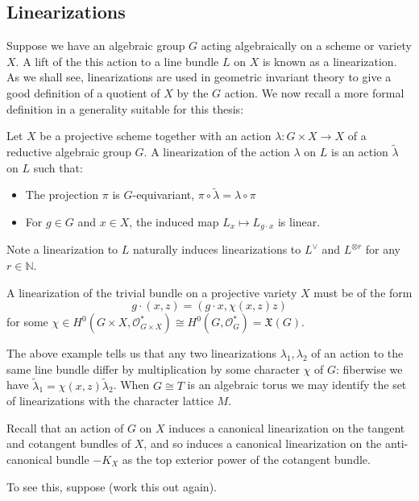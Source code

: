 \subsection{Linearizations} \label{basics:linearizations}
Suppose we have an algebraic group \(G\) acting algebraically on a scheme or variety \(X\). A lift of the this action to a line bundle \(L\) on \(X\) is known as a linearization. As we shall see, linearizations are used in geometric invariant theory to give a good definition of a quotient of \(X\) by the \(G\) action. We now recall a more formal definition in a generality suitable for this thesis:
\begin{definition}
 Let \(X\) be a projective scheme together with an action \( \lambda : G \times X \to X\) of a reductive algebraic group \(G\). A linearization of the action \(\lambda\) on \(L\) is an action \(\tilde{\lambda}\) on \(L\) such that:
\begin{itemize}
\item The projection \(\pi\) is \(G\)-equivariant, \(\pi \circ \tilde{\lambda} = \lambda \circ \pi \)
\item For \(g \in G\) and \(x \in X\), the induced map \(L_x \mapsto L_{g \cdot x}\) is linear.
\end{itemize}
\end{definition}
%
%
%
Note a linearization to \(L\) naturally induces linearizations to \(L^\vee\) and \(L^{\otimes r}\) for any \(r \in \mathbb{N}\).
%
%
%
\begin{example}
A linearization of the trivial bundle on a projective variety \(X\) must be of the form
\[
g \cdot (x,z) = (g \cdot x, \chi(x,z)z)
\]
for some \(\chi \in H^0(G \times X, \mathcal{O}_{G \times X}^*) \cong H^0(G, \mathcal{O}_G^*) = \mathfrak{X}(G).\)
\end{example}
The above example tells us that any two linearizations \(\lambda_1,\lambda_2\) of an action to the same line bundle differ by multiplication by some character \(\chi\) of \(G\): fiberwise we have \(\tilde{\lambda}_1 = \chi(x,z) \tilde{\lambda}_2\). When \(G \cong T\) is an algebraic torus we may identify the set of linearizations with the character lattice \(M\).
\begin{example}
Recall that an action of \(G\) on \(X\) induces a canonical linearization on the tangent and cotangent bundles of \(X\), and so induces a canonical linearization on the anti-canonical bundle \(-K_X\) as the top exterior power of the cotangent bundle.

To see this, suppose (work this out again).
\end{example}
